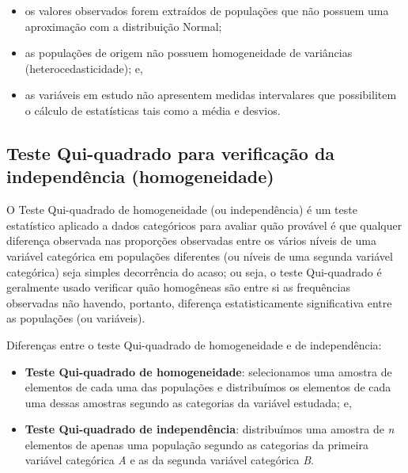 \documentclass[
]{book}
\providecommand{\tightlist}{%
  \setlength{\itemsep}{0pt}\setlength{\parskip}{0pt}}
\begin{document}
\hfill\break

\begin{itemize}
\tightlist
\item
  os valores observados forem extraídos de populações que não possuem uma aproximação com a distribuição Normal;\\
\item
  as populações de origem não possuem homogeneidade de variâncias (heterocedasticidade); e,\\
\item
  as variáveis em estudo não apresentem medidas intervalares que possibilitem o cálculo de estatísticas tais como a média e desvios.
\end{itemize}

\hfill\break

\hypertarget{teste-qui-quadrado-para-verificauxe7uxe3o-da-independuxeancia-homogeneidade}{%
\subsection{Teste Qui-quadrado para verificação da independência (homogeneidade)}\label{teste-qui-quadrado-para-verificauxe7uxe3o-da-independuxeancia-homogeneidade}}

\hfill\break

O Teste Qui-quadrado de homogeneidade (ou independência) é um teste estatístico aplicado a dados categóricos para avaliar quão provável é que qualquer diferença observada nas proporções observadas entre os vários níveis de uma variável categórica em populações diferentes (ou níveis de uma segunda variável categórica) seja simples decorrência do acaso; ou seja, o teste Qui-quadrado é geralmente usado verificar quão homogêneas são entre si as frequências observadas não havendo, portanto, diferença estatisticamente significativa entre as populações (ou variáveis).

\hfill\break

Diferenças entre o teste Qui-quadrado de homogeneidade e de independência:

\hfill\break

\begin{itemize}
\tightlist
\item
  \textbf{Teste Qui-quadrado de homogeneidade}: selecionamos uma amostra de elementos de cada uma das populações e distribuímos os elementos de cada uma dessas amostras segundo as categorias da variável estudada; e,\\
\item
  \textbf{Teste Qui-quadrado de independência}: distribuímos uma amostra de \emph{n} elementos de apenas uma população segundo as categorias da primeira variável categórica \emph{A} e as da segunda variável categórica \emph{B}.
\end{itemize}
\end{document}
